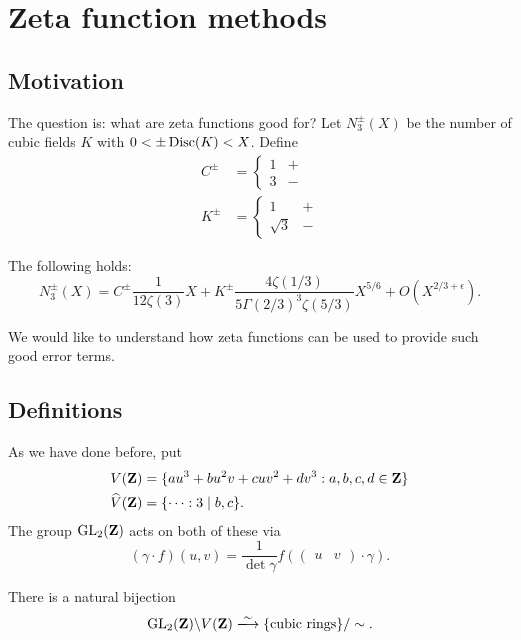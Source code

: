 
\section{Zeta function methods}





\subsection{Motivation}

The question is: what are zeta functions good for? Let $N_3^\pm(X)$ be the 
number of cubic fields $K$ with $0<\pm\operatorname{Disc}(K)<X$. Define 
\begin{align*}
  C^\pm &= \begin{cases} 1 & + \\ 3 & - \end{cases} \\
  K^\pm &= \begin{cases} 1 & + \\ \sqrt 3 & -\end{cases}
\end{align*}

\begin{theo}
The following holds: 
\[
  N_3^\pm(X)=C^\pm \frac{1}{12\zeta(3)}X + K^\pm \frac{4\zeta(1/3)}{5\Gamma(2/3)^3\zeta(5/3)} X^{5/6} + O(X^{2/3+\epsilon}) .
\]
\end{theo}

We would like to understand how zeta functions can be used to provide such 
good error terms. 





\subsection{Definitions}

As we have done before, put 
\begin{align*}
  V(\mathbf{Z}) &= \{a u^3 + b u^2 v + c u v^2 + d v^3:a,b,c,d\in \mathbf{Z}\} \\
  \widehat V(\mathbf{Z}) &= \{\cdots : 3\mid b,c\} .
\end{align*}
The group $\operatorname{GL}_2(\mathbf{Z})$ acts on both of these via 
\[
  (\gamma\cdot f)(u,v) = \frac{1}{\det\gamma}f\left(\begin{pmatrix} u & v\end{pmatrix}\cdot \gamma\right) .
\]
\begin{theo}
There is a natural bijection 
\[
  \generallinear_2(\dZ)\backslash V(\dZ) \iso \{\text{cubic rings}\}/\sim .
\]
\end{theo}

